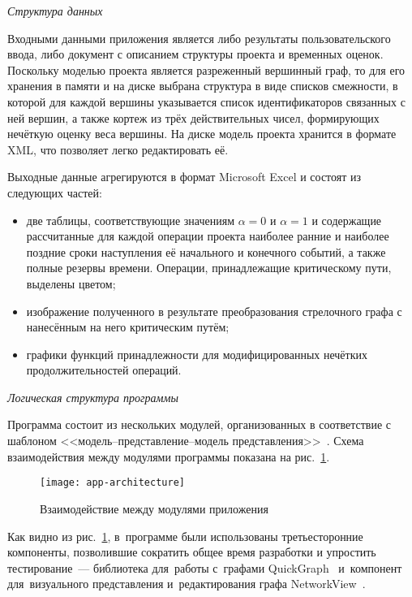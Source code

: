 \textit{Структура данных}

Входными данными приложения является либо результаты пользовательского ввода, либо документ с описанием структуры проекта и временных оценок. Поскольку моделью проекта является разреженный вершинный граф, то для его хранения в памяти и на диске выбрана структура в виде списков смежности, в которой для каждой вершины указывается список идентификаторов связанных с ней вершин, а также кортеж из трёх действительных чисел, формирующих нечёткую оценку веса вершины. На диске модель проекта хранится в формате XML, что позволяет легко редактировать её.

Выходные данные агрегируются в формат Microsoft Excel и состоят из следующих частей:
\begin{itemize}
  \item две таблицы, соответствующие значениям $\alpha=0$ и $\alpha=1$ и содержащие рассчитанные для каждой операции проекта наиболее ранние и наиболее поздние сроки наступления её начального и конечного событий, а также полные резервы времени. Операции, принадлежащие критическому пути, выделены цветом;
  \item изображение полученного в результате преобразования стрелочного графа с нанесённым на него критическим путём;
  \item графики функций принадлежности для модифицированных нечётких продолжительностей операций.
\end{itemize}

\textit{Логическая структура программы}

Программа состоит из нескольких модулей, организованных в соответствие с шаблоном <<модель--представление--модель представления>>~\cite{NetworkView_CodeProject}. Схема взаимодействия между модулями программы показана на рис.~\ref{fig:app-architecture}.
\begin{figure}[t!]
  \centering
  {
    \texttt{[image: app-architecture]}
  }
  \caption{Взаимодействие между модулями приложения}
  \label{fig:app-architecture}
\end{figure}

Как видно из рис.~\ref{fig:app-architecture}, в~программе были использованы третьесторонние компоненты, позволившие сократить общее время разработки и упростить тестирование~--- библиотека для~работы с~графами QuickGraph~\cite{QuickGraph_Codeplex, QuickGraph_CodeProject} и~компонент для~визуального представления и~редактирования графа NetworkView~\cite{NetworkView_CodeProject}.

